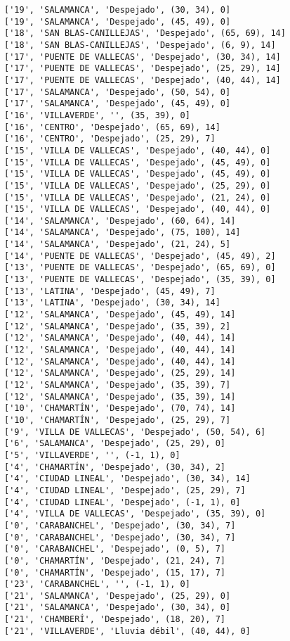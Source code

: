 \documentclass[11pt]{article}
\begin{document}
\begin{Verbatim}[commandchars=\\\{\}]
['19', 'SALAMANCA', 'Despejado', (30, 34), 0]
['19', 'SALAMANCA', 'Despejado', (45, 49), 0]
['18', 'SAN BLAS-CANILLEJAS', 'Despejado', (65, 69), 14]
['18', 'SAN BLAS-CANILLEJAS', 'Despejado', (6, 9), 14]
['17', 'PUENTE DE VALLECAS', 'Despejado', (30, 34), 14]
['17', 'PUENTE DE VALLECAS', 'Despejado', (25, 29), 14]
['17', 'PUENTE DE VALLECAS', 'Despejado', (40, 44), 14]
['17', 'SALAMANCA', 'Despejado', (50, 54), 0]
['17', 'SALAMANCA', 'Despejado', (45, 49), 0]
['16', 'VILLAVERDE', '', (35, 39), 0]
['16', 'CENTRO', 'Despejado', (65, 69), 14]
['16', 'CENTRO', 'Despejado', (25, 29), 7]
['15', 'VILLA DE VALLECAS', 'Despejado', (40, 44), 0]
['15', 'VILLA DE VALLECAS', 'Despejado', (45, 49), 0]
['15', 'VILLA DE VALLECAS', 'Despejado', (45, 49), 0]
['15', 'VILLA DE VALLECAS', 'Despejado', (25, 29), 0]
['15', 'VILLA DE VALLECAS', 'Despejado', (21, 24), 0]
['15', 'VILLA DE VALLECAS', 'Despejado', (40, 44), 0]
['14', 'SALAMANCA', 'Despejado', (60, 64), 14]
['14', 'SALAMANCA', 'Despejado', (75, 100), 14]
['14', 'SALAMANCA', 'Despejado', (21, 24), 5]
['14', 'PUENTE DE VALLECAS', 'Despejado', (45, 49), 2]
['13', 'PUENTE DE VALLECAS', 'Despejado', (65, 69), 0]
['13', 'PUENTE DE VALLECAS', 'Despejado', (35, 39), 0]
['13', 'LATINA', 'Despejado', (45, 49), 7]
['13', 'LATINA', 'Despejado', (30, 34), 14]
['12', 'SALAMANCA', 'Despejado', (45, 49), 14]
['12', 'SALAMANCA', 'Despejado', (35, 39), 2]
['12', 'SALAMANCA', 'Despejado', (40, 44), 14]
['12', 'SALAMANCA', 'Despejado', (40, 44), 14]
['12', 'SALAMANCA', 'Despejado', (40, 44), 14]
['12', 'SALAMANCA', 'Despejado', (25, 29), 14]
['12', 'SALAMANCA', 'Despejado', (35, 39), 7]
['12', 'SALAMANCA', 'Despejado', (35, 39), 14]
['10', 'CHAMARTÍN', 'Despejado', (70, 74), 14]
['10', 'CHAMARTÍN', 'Despejado', (25, 29), 7]
['9', 'VILLA DE VALLECAS', 'Despejado', (50, 54), 6]
['6', 'SALAMANCA', 'Despejado', (25, 29), 0]
['5', 'VILLAVERDE', '', (-1, 1), 0]
['4', 'CHAMARTÍN', 'Despejado', (30, 34), 2]
['4', 'CIUDAD LINEAL', 'Despejado', (30, 34), 14]
['4', 'CIUDAD LINEAL', 'Despejado', (25, 29), 7]
['4', 'CIUDAD LINEAL', 'Despejado', (-1, 1), 0]
['4', 'VILLA DE VALLECAS', 'Despejado', (35, 39), 0]
['0', 'CARABANCHEL', 'Despejado', (30, 34), 7]
['0', 'CARABANCHEL', 'Despejado', (30, 34), 7]
['0', 'CARABANCHEL', 'Despejado', (0, 5), 7]
['0', 'CHAMARTÍN', 'Despejado', (21, 24), 7]
['0', 'CHAMARTÍN', 'Despejado', (15, 17), 7]
['23', 'CARABANCHEL', '', (-1, 1), 0]
['21', 'SALAMANCA', 'Despejado', (25, 29), 0]
['21', 'SALAMANCA', 'Despejado', (30, 34), 0]
['21', 'CHAMBERÍ', 'Despejado', (18, 20), 7]
['21', 'VILLAVERDE', 'Lluvia débil', (40, 44), 0]

\end{Verbatim}
\end{document}
